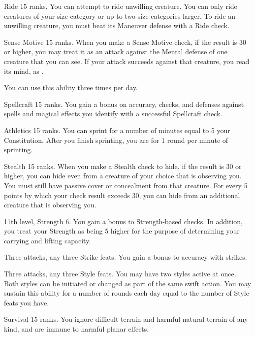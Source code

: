 \featpre Ride 15 ranks.
\featben You can attempt to ride unwilling creature.
You can only ride creatures of your size category or up to two size categories larger.
To ride an unwilling creature, you must beat its Maneuver defense with a Ride check.

\featpre Sense Motive 15 ranks.
\featben When you make a Sense Motive check, if the result is 30 or higher, you may treat it as an attack against the Mental defense of one creature that you can see.
If your attack succeeds against that creature, you read its mind, as .

You can use this ability three times per day.

\featpre Spellcraft 15 ranks.
\featben You gain a  bonus on accuracy, checks, and defenses against spells and magical effects you identify with a successful Spellcraft check.

\featpre Athletics 15 ranks.
\featben You can sprint for a number of minutes equal to 5 \add your Constitution.
After you finish sprinting, you are \fatigued for 1 round per minute of sprinting.

\featpre Stealth 15 ranks.
\featben When you make a Stealth check to hide, if the result is 30 or higher, you can hide even from a creature of your choice that is observing you.
You must still have passive cover or concealment from that creature.
For every 5 points by which your check result exceeds 30, you can hide from an additional creature that is observing you.

\featpres 11th level, Strength 6.
\featben You gain a  bonus to Strength-based checks.
In addition, you treat your Strength as being 5 higher for the purpose of determining your carrying and lifting capacity.

\featpres Three attacks, any three Strike feats.
\featben You gain a  bonus to accuracy with strikes.

\featpres Three attacks, any three Style feats.
\featben You may have two styles active at once.
Both styles can be initiated or changed as part of the same swift action.
You may sustain this ability for a number of rounds each day equal to the number of Style feats you have.

\featpre Survival 15 ranks.
\featben You ignore difficult terrain and harmful natural terrain of any kind, and are immune to harmful planar effects.

